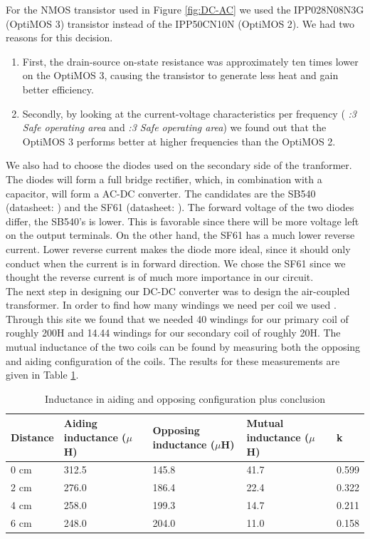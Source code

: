 \documentclass[final]{scrreprt} %
\begin{document}
For the NMOS transistor used in Figure \ref{fig:DC-AC} we used the IPP028N08N3G (OptiMOS 3) transistor instead of the IPP50CN10N (OptiMOS 2).
We had two reasons for this decision.
\begin{enumerate}
\item First, the drain-source on-state resistance was approximately ten times lower on the OptiMOS 3, causing the transistor to generate less heat and gain better efficiency.
\item Secondly, by looking at the current-voltage characteristics per frequency (\cite{OptiMOS2} \emph{:3 Safe operating area} and \cite{OptiMOS3} \emph{:3 Safe operating area}) we found out that the OptiMOS 3 performs better at higher frequencies than the OptiMOS 2.
\end{enumerate}

We also had to choose the diodes used on the secondary side of the tranformer. 
The diodes will form a full bridge rectifier, which, in combination with a capacitor, will form a AC-DC converter.
The candidates are the SB540 (datasheet: \cite{SB540}) and the SF61 (datasheet: \cite{SF61}).
The forward voltage of the two diodes differ, the SB540's is lower. 
This is favorable since there will be more voltage left on the output terminals.
On the other hand, the SF61 has a much lower reverse current. 
Lower reverse current makes the diode more ideal, since it should only conduct when the current is in forward direction.
We chose the SF61 since we thought the reverse current is of much more importance in our circuit.\\




The next step in designing our DC-DC converter was to design the air-coupled transformer. 
In order to find how many windings we need per coil we used \cite{windings}.
Through this site we found that we needed 40 windings for our primary coil of roughly \unit{200}{\micro}H and 14.44 windings for our secondary coil of roughly \unit{20}{\micro}H.
The mutual inductance of the two coils can be found by measuring both the opposing and aiding configuration of the coils. 
The results for these measurements are given in Table \ref{tab:inductances}.

\begin{table} [h]
\begin{center}
	\begin{tabular}{ l | l | l | l | l }
	Distance & Aiding inductance ($\mu$H) & Opposing inductance ($\mu$H) & Mutual inductance ($\mu$H) & k \\ \hline
  	0 cm & 312.5 & 145.8 & 41.7 & 0.599 \\
	2 cm & 276.0 & 186.4 & 22.4 & 0.322 \\
	4 cm & 258.0 & 199.3 & 14.7 & 0.211 \\
	6 cm & 248.0 & 204.0 & 11.0 & 0.158 \\
	\end{tabular}
	\caption{Inductance in aiding and opposing configuration plus conclusion}
	\label{tab:inductances}
\end{center}
\end{table}
\end{document}
